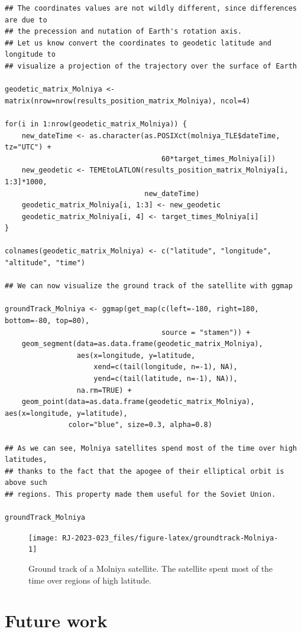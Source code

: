 \begin{verbatim}
## The coordinates values are not wildly different, since differences are due to
## the precession and nutation of Earth's rotation axis.
## Let us know convert the coordinates to geodetic latitude and longitude to
## visualize a projection of the trajectory over the surface of Earth

geodetic_matrix_Molniya <- matrix(nrow=nrow(results_position_matrix_Molniya), ncol=4)

for(i in 1:nrow(geodetic_matrix_Molniya)) {
    new_dateTime <- as.character(as.POSIXct(molniya_TLE$dateTime, tz="UTC") + 
                                     60*target_times_Molniya[i])
    new_geodetic <- TEMEtoLATLON(results_position_matrix_Molniya[i, 1:3]*1000,
                                 new_dateTime)
    geodetic_matrix_Molniya[i, 1:3] <- new_geodetic
    geodetic_matrix_Molniya[i, 4] <- target_times_Molniya[i]
}

colnames(geodetic_matrix_Molniya) <- c("latitude", "longitude", "altitude", "time")

## We can now visualize the ground track of the satellite with ggmap

groundTrack_Molniya <- ggmap(get_map(c(left=-180, right=180, bottom=-80, top=80),
                                     source = "stamen")) +
    geom_segment(data=as.data.frame(geodetic_matrix_Molniya), 
                 aes(x=longitude, y=latitude, 
                     xend=c(tail(longitude, n=-1), NA), 
                     yend=c(tail(latitude, n=-1), NA)), 
                 na.rm=TRUE) +
    geom_point(data=as.data.frame(geodetic_matrix_Molniya), aes(x=longitude, y=latitude), 
               color="blue", size=0.3, alpha=0.8)

## As we can see, Molniya satellites spend most of the time over high latitudes,
## thanks to the fact that the apogee of their elliptical orbit is above such
## regions. This property made them useful for the Soviet Union.

groundTrack_Molniya
\end{verbatim}

\begin{figure}[H]
\texttt{[image: RJ-2023-023\_files/figure-latex/groundtrack-Molniya-1]} \caption{Ground track of a Molniya satellite. The satellite spent most of the time over regions of high latitude.}\label{fig:groundtrack-Molniya}
\end{figure}

\hypertarget{future-work}{%
\section{Future work}\label{future-work}}


